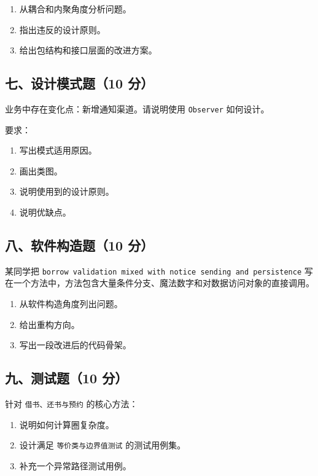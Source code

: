 \documentclass[UTF8,zihao=-4]{ctexart}
\begin{document}
\begin{enumerate}
\item 从耦合和内聚角度分析问题。
\item 指出违反的设计原则。
\item 给出包结构和接口层面的改进方案。
\end{enumerate}


\subsection{七、设计模式题（10 分）}


业务中存在变化点：新增通知渠道。请说明使用 \texttt{Observer} 如何设计。


要求：


\begin{enumerate}
\item 写出模式适用原因。
\item 画出类图。
\item 说明使用到的设计原则。
\item 说明优缺点。
\end{enumerate}


\subsection{八、软件构造题（10 分）}


某同学把 \texttt{borrow validation mixed with notice sending and persistence} 写在一个方法中，方法包含大量条件分支、魔法数字和对数据访问对象的直接调用。


\begin{enumerate}
\item 从软件构造角度列出问题。
\item 给出重构方向。
\item 写出一段改进后的代码骨架。
\end{enumerate}


\subsection{九、测试题（10 分）}


针对 \texttt{借书、还书与预约} 的核心方法：


\begin{enumerate}
\item 说明如何计算圈复杂度。
\item 设计满足 \texttt{等价类与边界值测试} 的测试用例集。
\item 补充一个异常路径测试用例。
\end{enumerate}
\end{document}
